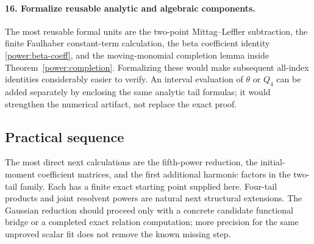 \paragraph{16. Formalize reusable analytic and algebraic components.}
The most reusable formal units are the two-point
Mittag--Leffler subtraction, the finite Faulhaber constant-term
calculation, the beta coefficient identity
\eqref{power:beta-coeff}, and the moving-monomial completion lemma
inside Theorem~\ref{power:completion}. Formalizing these would
make subsequent all-index identities considerably easier to
verify. An interval evaluation of $\theta$ or $Q_4$ can be added
separately by enclosing the same analytic tail formulas; it
would strengthen the numerical artifact, not replace the exact
proof.

\subsection{Practical sequence}

The most direct next calculations are the fifth-power reduction,
the initial-moment coefficient matrices, and the first additional
harmonic factors in the two-tail family. Each has a finite exact
starting point supplied here. Four-tail products and joint
resolvent powers are natural next structural extensions. The
Gaussian reduction should proceed only with a concrete candidate
functional bridge or a completed exact relation computation;
more precision for the same unproved scalar fit does not remove
the known missing step.

